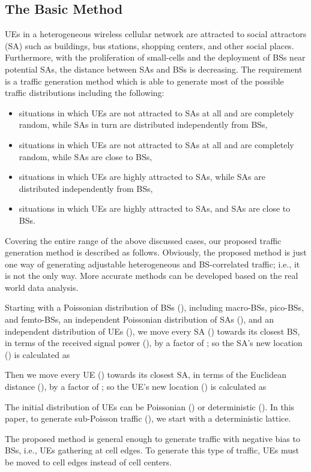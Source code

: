 \documentclass[journal]{IEEEtran}
\begin{document}
\subsection{The Basic Method}
\label{subsec:basicmethod}

UEs in a heterogeneous wireless cellular network are attracted to social attractors (SA) such as buildings, bus stations, shopping centers, and other social places. Furthermore, with the proliferation of small-cells and the deployment of BSs near potential SAs, the distance between SAs and BSs is decreasing. The requirement is a traffic generation method which is able to generate most of the possible traffic distributions including the following:
\begin{itemize}
\item situations in which UEs are not attracted to SAs at all and are completely random, while SAs in turn are distributed independently from BSs,
\item situations in which UEs are not attracted to SAs at all and are completely random, while SAs are close to BSs,
\item situations in which UEs are highly attracted to SAs, while SAs are distributed independently from BSs,
\item situations in which UEs are highly attracted to SAs, and SAs are close to BSs.
\end{itemize}
Covering the entire range of the above discussed cases, our proposed traffic generation method is described as follows. Obviously, the proposed method is just one way of generating adjustable heterogeneous and BS-correlated traffic; i.e., it is not the only way. More accurate methods can be developed based on the real world data analysis.

Starting with a Poissonian distribution of BSs (), including macro-BSs, pico-BSs, and femto-BSs, an independent Poissonian distribution of SAs (), and an independent distribution of UEs (), we move every SA () towards its closest BS, in terms of the received signal power (), by a factor of ; so the SA's new location () is calculated as


Then we move every UE () towards its closest SA, in terms of the Euclidean distance (), by a factor of ; so the UE's new location () is calculated as


The initial distribution of UEs can be Poissonian () or deterministic (). In this paper, to generate sub-Poisson traffic (), we start with a deterministic lattice.

The proposed method is general enough to generate traffic with negative bias to BSs, i.e., UEs gathering at cell edges. To generate this type of traffic, UEs must be moved to cell edges instead of cell centers.
\end{document}
